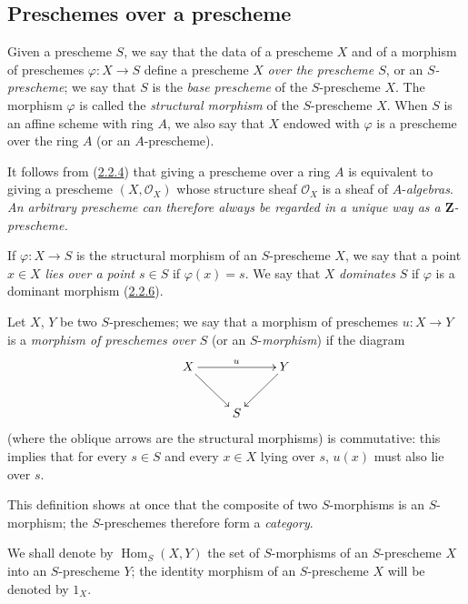 \subsection{Preschemes over a prescheme}
\label{subsection:I.2.5}

\begin{definition}[2.5.1]
\label{I.2.5.1}
Given a prescheme $S$, we say that the data of a prescheme $X$ and of a
morphism of preschemes $\varphi:X\to S$ define a prescheme $X$ \emph{over
the prescheme $S$}, or an \emph{$S$-prescheme}; we say that $S$ is the
\emph{base prescheme} of the $S$-prescheme $X$. The morphism $\varphi$ is
called the \emph{structural morphism} of the $S$-prescheme $X$. When $S$ is
an affine scheme with ring $A$, we also say that $X$ endowed with $\varphi$
is a prescheme over the ring $A$ (or an $A$-prescheme).
\end{definition}

It follows from (\hyperref[I.2.2.4]{2.2.4}) that giving a prescheme
over a ring $A$ is equivalent to giving a prescheme
$(X,\mathscr{O}_X)$ whose structure sheaf $\mathscr{O}_X$ is a sheaf
of $A$-\emph{algebras}. \emph{An arbitrary prescheme can therefore always be
regarded in a unique way as a $\mathbf{Z}$-prescheme.}

If $\varphi:X\to S$ is the structural morphism of an $S$-prescheme $X$, we
say that a point $x\in X$ \emph{lies over a point $s\in S$} if
$\varphi(x)=s$. We say that $X$ \emph{dominates} $S$ if $\varphi$ is a
dominant morphism (\hyperref[I.2.2.6]{2.2.6}).

\begin{env}[2.5.2]
\label{I.2.5.2}
Let $X$, $Y$ be two $S$-preschemes; we say that a morphism of preschemes
$u:X\to Y$ is a \emph{morphism of preschemes over $S$} (or an
$S$-\emph{morphism}) if the diagram
\label{I.2.5.2.diagram}
\[
  \xymatrix{
    X\ar[rr]^u\ar[dr] & & Y\ar[dl]\\
    & S &
  }
\]
(where the oblique arrows are the structural morphisms) is commutative:
this implies that for every $s\in S$ and every $x\in X$ lying over $s$,
$u(x)$ must also lie over $s$.
\end{env}

This definition shows at once that the composite of two $S$-morphisms is an
$S$-morphism; the $S$-preschemes therefore form a \emph{category}.

We shall denote by $\operatorname{Hom}_S(X,Y)$ the set of $S$-morphisms of
an $S$-prescheme $X$ into an $S$-prescheme $Y$; the identity morphism of an
$S$-prescheme $X$ will be denoted by $1_X$.

